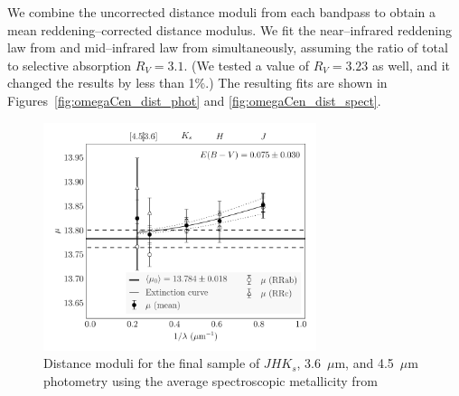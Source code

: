 \documentclass[a4paper,fleqn,usenatbib]{mnras}
\begin{document}
We combine the uncorrected distance moduli from each bandpass to obtain a mean reddening--corrected distance modulus. We fit the near--infrared reddening law from \citet{1989ApJ...345..245C} and mid--infrared law from \citet{2005ApJ...619..931I} simultaneously, assuming the ratio of total to selective absorption $R_V = 3.1$. (We tested a value of $R_V = 3.23$ as well, and it changed the results by less than 1\%.) The resulting fits are shown in Figures~\ref{fig:omegaCen_dist_phot} and \ref{fig:omegaCen_dist_spect}.


\begin{figure}
\begin{center}
\includegraphics[width=80mm]{reworked_fitting_code/final_plots/multiwavelength_distance_m4_clipped_mean.pdf}
\caption{Distance moduli for the final sample of $J\!H\!K_s$, 3.6~$\mu$m, and 4.5~$\mu$m photometry using the average spectroscopic metallicity from \citet{2000AJ....119.1824R}}
\label{fig:omegaCen_dist_m4_mean}
\end{center}
\end{figure}


\end{document}
